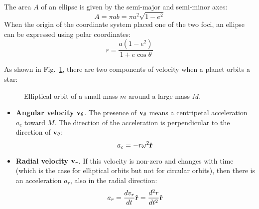 \documentclass[11pt]{article}
\newcommand{\mb}[1]{
  \ensuremath\mathbf{#1}
}
\begin{document}
The area $A$ of an ellipse is given by the semi-major and semi-minor axes:
\begin{equation}
  A=\pi ab=\pi a^2\sqrt{1-e^2}
  \label{A2}
\end{equation}
When the origin of the coordinate system placed one of the two foci, an ellipse
can be expressed using polar coordinates:
\begin{equation}
  r=\frac{a(1-e^2)}{1+e\cos\theta}
  \label{ellipse-eq}
\end{equation}

As shown in Fig.~\ref{eorbit}, there are two components of velocity when a
planet orbits a star:
\begin{figure}[!ht]
  \centering
  \caption{Elliptical orbit of a small mass $m$ around a large mass $M$.}
  \label{eorbit}
\end{figure}
\begin{itemize}[leftmargin=15pt]
\item\textbf{Angular velocity} $\mb{v}_\theta$. The presence of $\mb{v}_\theta$
  means a centripetal acceleration $a_c$ toward $M$. The direction of the
  acceleration is perpendicular to the direction of $\mb{v}_\theta$:
  \begin{equation}
    a_c=-r\omega^2\hat{\mb{r}}
  \end{equation}
\item\textbf{Radial velocity} $\mb{v}_r$. If this velocity is non-zero and
  changes with time (which is the case for elliptical orbits but not for
  circular orbits), then there is an acceleration $a_r$, also in the radial
  direction:
  \begin{equation}
    a_r=\frac{dv_r}{dt}\hat{\mb{r}}=\frac{d^2r}{dt^2}\hat{\mb{r}}
  \end{equation}
\end{itemize}
\end{document}
